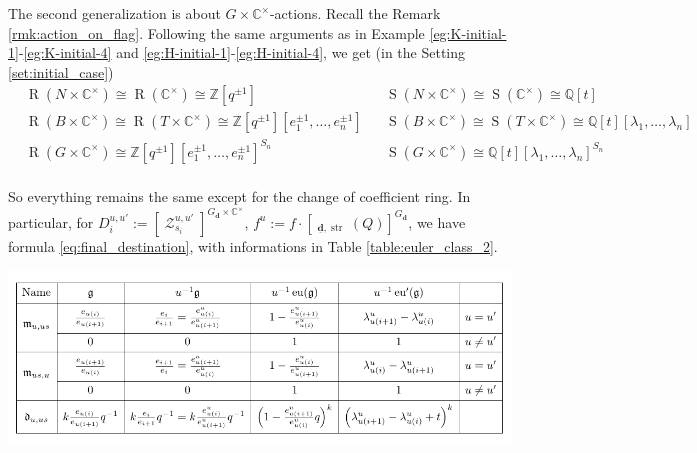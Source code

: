 \documentclass[reqno,11pt]{book}
\numberwithin{equation}{section}
\theoremstyle{plain}
\theoremstyle{plain}
\numberwithin{equation}{section}
\theoremstyle{remark}
\DeclareMathOperator{\RRep}{\widetilde{\operatorname{Rep}}}
\DeclareMathOperator{\Rpt}{\operatorname{R}}
\DeclareMathOperator{\Spt}{\operatorname{S}}
\DeclareMathOperator{\St}{\mathcal{Z}}
\DeclareMathOperator{\str}{\operatorname{str}}
\newcommand{\dimvec}[1]{\mathbf{#1}}
\newcommand{\ftdimvec}[1]{\underline{\dimvec{#1}}}
\begin{document}
The second generalization is about $G \times \mathbb{C}^{\times}$-actions. Recall the Remark \ref{rmk:action_on_flag}. Following the same arguments as in Example \ref{eg:K-initial-1}-\ref{eg:K-initial-4} and \ref{eg:H-initial-1}-\ref{eg:H-initial-4}, we get (in the Setting \ref{set:initial_case})
\begin{equation*}
\begin{aligned}
 &\Rpt(N \times \mathbb{C}^{\times}) \cong \Rpt(\mathbb{C}^{\times}) \cong \mathbb{Z}[q^{\pm 1 }]&&\Spt(N \times \mathbb{C}^{\times}) \cong \Spt(\mathbb{C}^{\times}) \cong \mathbb{Q}[t] \\
 &\Rpt(B \times \mathbb{C}^{\times}) \cong \Rpt(T \times \mathbb{C}^{\times}) \cong \mathbb{Z}[q^{\pm 1 }]\!\left[ e_1^{\pm 1},\ldots,e_n^{\pm 1} \right]&&\Spt(B \times \mathbb{C}^{\times}) \cong \Spt(T \times \mathbb{C}^{\times}) \cong \mathbb{Q}[t]\!\left[ \lambda_1,\ldots,\lambda_n \right]\\
 &\Rpt(G \times \mathbb{C}^{\times})  \cong \mathbb{Z}[q^{\pm 1}]\!\left[ e_1^{\pm 1},\ldots,e_n^{\pm 1} \right]^{S_n}&&\Spt(G \times \mathbb{C}^{\times}) \cong \mathbb{Q}[t]\!\left[ \lambda_1,\ldots,\lambda_n \right]^{S_n}\\ 
\end{aligned}
\end{equation*}

So everything remains the same except for the change of coefficient ring. In particular, for $D_i^{u,u'}:=[\St_{s_{i}}^{u,u'}]^{G_{\dimvec{d}} \times \mathbb{C}^{\times}}$, $f^{u}:=f \cdot \left[\RRep_{\ftdimvec{d},\str}(Q) \right]^{G_{\dimvec{d}}}$, we have formula \eqref{eq:final_destination}, with informations in Table \ref{table:euler_class_2}.

\begin{table}[ht]
  \vspace{0cm}
    \centering  \includegraphics[width=15cm]{figures/table/table_euler_class_q.pdf}
      \caption{}
      \label{table:euler_class_2}        
\end{table}
\end{document}
